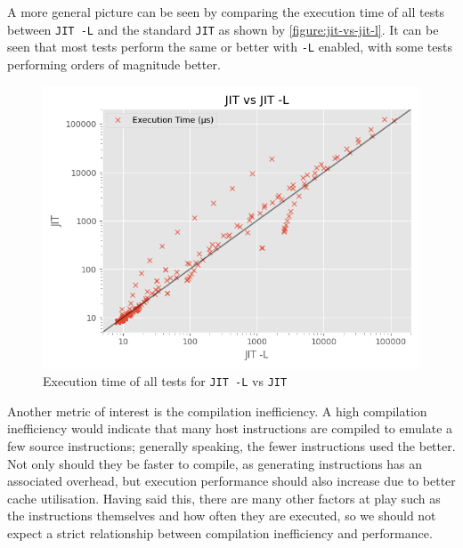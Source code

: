 A more general picture can be seen by comparing the execution time of all tests between \texttt{JIT -L} and the standard \texttt{JIT} as shown by \autoref{figure:jit-vs-jit-l}. It can be seen that most tests perform the same or better with \texttt{-L} enabled, with some tests performing orders of magnitude better.

\begin{figure}[H]
    \centering
    \includegraphics[scale=0.75]{output/graphs/scatter/vs/JIT -L-vs-JIT-time.png}
    \caption{Execution time of all tests for \texttt{JIT -L} vs \texttt{JIT}}
    \label{figure:jit-vs-jit-l}
\end{figure}

Another metric of interest is the compilation inefficiency. A high compilation inefficiency would indicate that many host instructions are compiled to emulate a few source instructions; generally speaking, the fewer instructions used the better. Not only should they be faster to compile, as generating instructions has an associated overhead, but execution performance should also increase due to better cache utilisation. Having said this, there are many other factors at play such as the instructions themselves and how often they are executed, so we should not expect a strict relationship between compilation inefficiency and performance.

